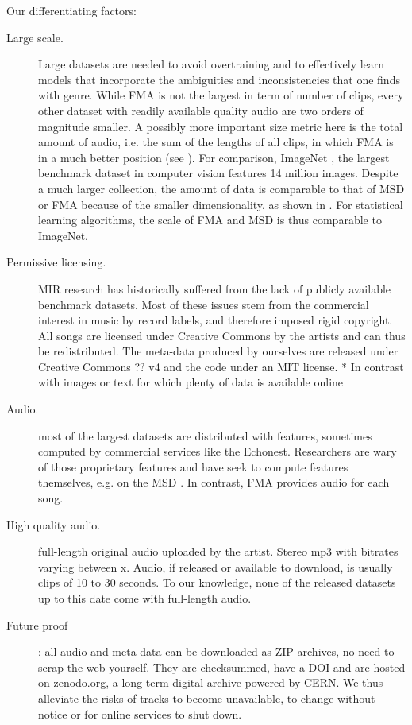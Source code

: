 \documentclass{article}
\newcommand{\todo}[1]{{\color{red} #1 }}
\begin{document}

Our differentiating factors:
\begin{description}
	\item[Large scale.] Large datasets are needed to avoid overtraining and to effectively learn models that incorporate the ambiguities and inconsistencies that one finds with genre. While FMA is not the largest in term of number of clips, every other dataset with readily available quality audio are two orders of magnitude smaller. A possibly more important size metric here is the total amount of audio, i.e. the sum of the lengths of all clips, in which FMA is in a much better position (see ). For comparison, ImageNet \cite{imagenet}, the largest benchmark dataset in computer vision features 14 million images. Despite a much larger collection, the amount of data is comparable to that of MSD or FMA because of the smaller dimensionality, as shown in . For statistical learning algorithms, the scale of FMA and MSD is thus comparable to ImageNet.
	\item[Permissive licensing.] MIR research has historically suffered from the lack of publicly available benchmark datasets. Most of these issues stem from the commercial interest in music by record labels, and therefore imposed rigid copyright. All songs are licensed under Creative Commons by the artists and can thus be redistributed. The meta-data produced by ourselves are released under \todo{Creative Commons ?? v4} and the code under an MIT license.
* In contrast with images or text for which plenty of data is available online
	\item[Audio.] most of the largest datasets are distributed with features, sometimes computed by commercial services like the Echonest. Researchers are wary of those proprietary features and have seek to compute features themselves, e.g. on the MSD \cite{msd_features}. In contrast, FMA provides audio for each song.
	\item[High quality audio.] full-length original audio uploaded by the artist. Stereo mp3 with bitrates varying between x. Audio, if released or available to download, is usually clips of 10 to 30 seconds. To our knowledge, none of the released datasets up to this date come with full-length audio.
	\item[Future proof]: all audio and meta-data can be downloaded as ZIP archives, no need to scrap the web yourself. They are checksummed, have a DOI and are hosted on \href{https://zenodo.org}{zenodo.org}, a long-term digital archive powered by CERN. We thus alleviate the risks of tracks to become unavailable, to change without notice or for online services to shut down.

\end{description}
\end{document}

